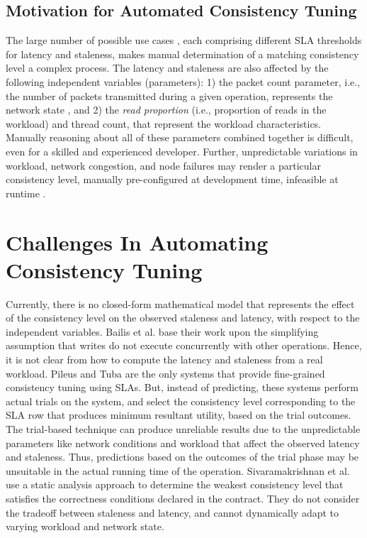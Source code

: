 \documentclass[conference]{IEEEtran}
\begin{document}
\subsection{Motivation for Automated Consistency Tuning}\label{sec:autocase}
The large number of possible use cases \cite{PlanetCassandra}, each comprising different SLA thresholds for
   latency and staleness, makes manual determination of a matching consistency level a
   complex process. The latency and staleness are also affected \cite{Bailis:2012:PBS:2212351.2212359} by the following independent variables (parameters): 1) the packet count parameter, i.e., the number of packets transmitted during a given operation, represents the network state \cite{Lakshman:2010:CDS:1773912.1773922},  and 2) the \emph{read proportion} (i.e., proportion of reads in the workload) and thread count, that represent the workload characteristics. Manually reasoning about all of these parameters combined together is difficult, even for a skilled and experienced developer.  Further, unpredictable variations in workload, network congestion, and node failures may render a particular consistency level, manually pre-configured at development time, infeasible  at runtime \cite{183989,Terry:2013:CSL:2517349.2522731}. 
\section{Challenges In Automating Consistency Tuning}\label{sec:challenge}
Currently, there is no closed-form mathematical model \cite{Bailis:2012:PBS:2212351.2212359} that represents the effect of the consistency level on the observed staleness and latency, with respect to the independent variables.
Bailis et al. \cite{Bailis:2012:PBS:2212351.2212359} base their work upon the simplifying assumption that writes do not execute concurrently with other operations. Hence, it is not clear from \cite{Bailis:2012:PBS:2212351.2212359} how to compute the latency and staleness from a real workload. Pileus and Tuba
 \cite{Terry:2013:CSL:2517349.2522731, Ardekani:2014:SGC:2685048.2685077} are the only systems that provide fine-grained consistency tuning using SLAs. But, instead of predicting, these systems perform actual trials on the system, and select the consistency level corresponding to the SLA row that produces minimum resultant utility, based on the trial outcomes. The trial-based technique can  produce unreliable results due to the unpredictable parameters like network conditions and workload that affect the observed latency and staleness. Thus, predictions based on the outcomes of the trial phase may be unsuitable in the actual running time of the operation. Sivaramakrishnan et al. \cite{Sivaramakrishnan:2015:DPO:2813885.2737981} use a static analysis approach to determine the weakest consistency level that satisfies the correctness conditions declared in the contract. They do not consider the tradeoff between staleness and latency, and cannot dynamically adapt to varying workload and network state. \def\tuple#1{\langle #1\rangle}
\end{document}
